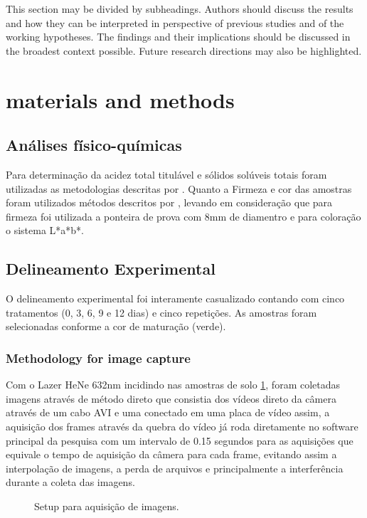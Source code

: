 \documentclass[journal,article,submit,moreauthors,pdftex,10pt,a4paper]{mdpi}
\theoremstyle{mdpi}
\newcounter{ex}
\newcounter{re}
\theoremstyle{mdpidefinition}
\begin{document}
This section may be divided by subheadings. Authors should discuss the results and how they can be interpreted in perspective of previous studies and of the working hypotheses. The findings and their implications should be discussed in the broadest context possible. Future research directions may also be highlighted.

\section{materials and methods}
\subsection{Análises físico-químicas} 

Para  determinação da acidez total titulável e sólidos solúveis totais foram utilizadas as metodologias descritas por \citep{Graca2015}. Quanto a Firmeza e cor das amostras foram utilizados métodos descritos por \citep{Horwitz}, levando em consideração que para firmeza foi utilizada a ponteira de prova com 8mm de diamentro e para coloração o sistema L*a*b*.



\subsection{Delineamento Experimental}
O delineamento experimental foi interamente casualizado contando com cinco tratamentos (0, 3, 6, 9 e 12 dias) e cinco repetições. As amostras foram selecionadas conforme a cor de maturação (verde). 
\subsubsection{Methodology for image capture}
Com o Lazer HeNe 632nm incidindo nas amostras de solo \ref{fig:laser}, foram coletadas imagens através de método direto que consistia dos vídeos  direto da câmera através de um cabo AVI e uma conectado em uma placa de vídeo assim, a aquisição dos frames através da quebra do vídeo já roda diretamente no software principal da pesquisa com um intervalo de 0.15 segundos para as aquisições que equivale o tempo de aquisição da câmera para cada frame, evitando assim a interpolação de imagens, a perda de arquivos e principalmente a interferência durante a coleta das imagens.

\begin{figure}[htb]
\centering
{}
\caption{Setup para aquisição de imagens.}
\label{fig:laser}
\end{figure}
\end{document}
